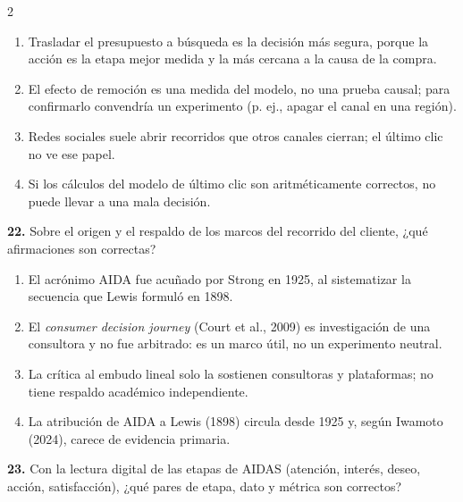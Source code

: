 \documentclass[10pt,letterpaper]{article}
\newcommand{\cas}{\framebox[1.0em]{\rule{0pt}{1.05ex}}}
\begin{document}
\begin{multicols}{2}
\begin{minipage}[t]{\columnwidth}
\vspace{1pt}\begin{enumerate}[label=\cas\ \alph*),leftmargin=2.3em,itemsep=1.2pt,topsep=1pt,parsep=0pt,partopsep=0pt]
\item Trasladar el presupuesto a búsqueda es la decisión más segura, porque la acción es la etapa mejor medida y la más cercana a la causa de la compra.
\item El efecto de remoción es una medida del modelo, no una prueba causal; para confirmarlo convendría un experimento (p. ej., apagar el canal en una región).
\item Redes sociales suele abrir recorridos que otros canales cierran; el último clic no ve ese papel.
\item Si los cálculos del modelo de último clic son aritméticamente correctos, no puede llevar a una mala decisión.
\end{enumerate}\end{minipage}\par\vspace{3pt}
\begin{minipage}[t]{\columnwidth}\noindent\textbf{22.} Sobre el origen y el respaldo de los marcos del recorrido del cliente, ¿qué afirmaciones son correctas?
\vspace{1pt}\begin{enumerate}[label=\cas\ \alph*),leftmargin=2.3em,itemsep=1.2pt,topsep=1pt,parsep=0pt,partopsep=0pt]
\item El acrónimo AIDA fue acuñado por Strong en 1925, al sistematizar la secuencia que Lewis formuló en 1898.
\item El \textit{consumer decision journey} (Court et al., 2009) es investigación de una consultora y no fue arbitrado: es un marco útil, no un experimento neutral.
\item La crítica al embudo lineal solo la sostienen consultoras y plataformas; no tiene respaldo académico independiente.
\item La atribución de AIDA a Lewis (1898) circula desde 1925 y, según Iwamoto (2024), carece de evidencia primaria.
\end{enumerate}\end{minipage}\par\vspace{3pt}
\begin{minipage}[t]{\columnwidth}\noindent\textbf{23.} Con la lectura digital de las etapas de AIDAS (atención, interés, deseo, acción, satisfacción), ¿qué pares de etapa, dato y métrica son correctos?

\end{minipage}
\end{multicols}
\end{document}
